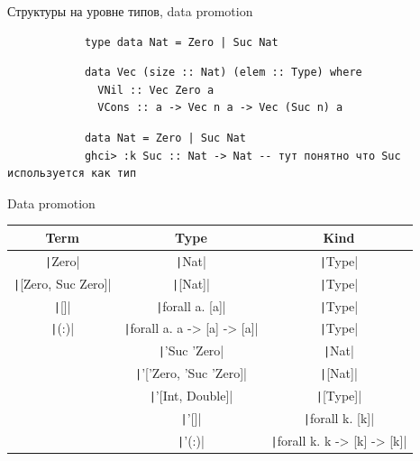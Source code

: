     \begin{frame}[fragile]{Структуры на уровне типов, data promotion}
        \pause
        \begin{verbatim}
            type data Nat = Zero | Suc Nat
        \end{verbatim}

        \pause\hspace{2em}
        \begin{verbatim}
            data Vec (size :: Nat) (elem :: Type) where
              VNil :: Vec Zero a
              VCons :: a -> Vec n a -> Vec (Suc n) a
        \end{verbatim}

        \pause\hspace{2em}
        \begin{verbatim}
            data Nat = Zero | Suc Nat
            ghci> :k Suc :: Nat -> Nat -- тут понятно что Suc используется как тип
        \end{verbatim}
    \end{frame}

    \begin{frame}[fragile]{Data promotion}
        \begin{tabular}{|c|c|c|}
            \hline
            Term                                   & Type                                            & Kind                                            \\
            \hline
            \texttt|Zero|             & \texttt|Nat|                       & \texttt|Type|                      \\
            \texttt|[Zero, Suc Zero]| & \texttt|[Nat]|                     & \texttt|Type|                      \\
            \texttt|[]|               & \texttt|forall a. [a]|             & \texttt|Type|                      \\
            \texttt|(:)|              & \texttt|forall a. a -> [a] -> [a]| & \texttt|Type|                      \\
            & \texttt|'Suc 'Zero|                & \texttt|Nat|                       \\
            & \texttt|'['Zero, 'Suc 'Zero]|      & \texttt|[Nat]|                     \\
            & \texttt|'[Int, Double]|            & \texttt|[Type]|                    \\
            & \texttt|'[]|                       & \texttt|forall k. [k]|             \\
            & \texttt|'(:)|                      & \texttt|forall k. k -> [k] -> [k]| \\
            \hline
        \end{tabular}
    \end{frame}

